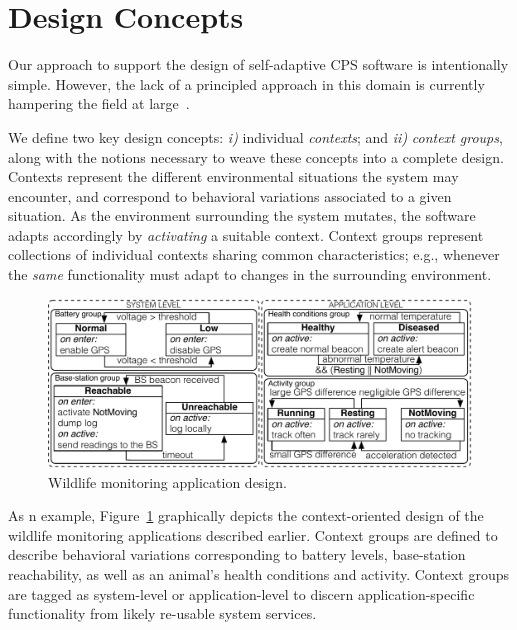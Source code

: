 \section{Design Concepts}
\label{sec:design}

Our approach to support the design of self-adaptive CPS software is
intentionally simple. However, the lack of a principled approach in
this domain is currently hampering the field at
large~\cite{Picco:2010:SEW:1882362.1882421}. %

We define two key design concepts: \emph{i)} individual
\emph{contexts}; and \emph{ii)} \emph{context groups}, along with the
notions necessary to weave these concepts into a complete design.
Contexts represent the different environmental situations the system
may encounter, and correspond to behavioral variations associated to a
given situation. As the environment surrounding the system mutates,
the software adapts accordingly by \emph{activating} a suitable
context. Context groups represent collections of individual contexts
sharing common characteristics; e.g., whenever the \emph{same}
functionality must adapt to changes in the surrounding environment.

\begin{figure}
\begin{center}
\includegraphics[scale=.45]{imgs/wildlifetracking}
\vspace{-4mm}
\caption{Wildlife monitoring application design.}
  \label{fig:design}
\vspace{-6mm}
\end{center}
\end{figure}

As n example, Figure~\ref{fig:design} graphically depicts the
context-oriented design of the wildlife monitoring applications
described earlier. Context groups are defined to describe behavioral
variations corresponding to battery levels, base-station reachability,
as well as an animal's health conditions and activity. Context groups
are tagged as system-level or application-level to discern
application-specific functionality from likely re-usable system
services.

